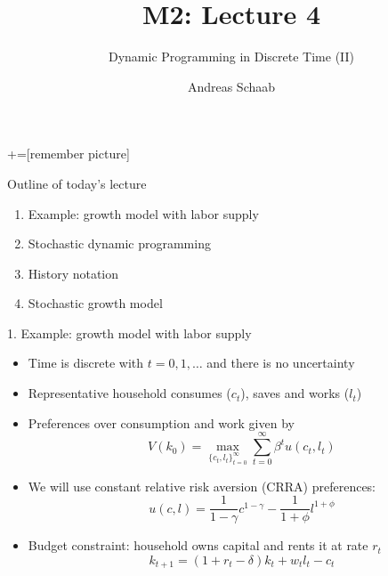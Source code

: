 \documentclass[10pt]{beamer}
\title{\large M2: Lecture 4}
\subtitle{Dynamic Programming in Discrete Time (II)}
\author{Andreas Schaab}
\date{}
\begin{document}
+=[remember picture]
\thispagestyle{empty}
\maketitle 
\newpage

\addtocounter{framenumber}{-1}




\begin{frame}{Outline of today's lecture}
\begin{enumerate}
\item Example: growth model with labor supply
\item Stochastic dynamic programming
\item History notation
\item Stochastic growth model
\end{enumerate}
\end{frame}



\begin{frame}{1. Example: growth model with labor supply}
\begin{itemize}
\item Time is discrete with $t = 0, 1, \ldots$ and there is no uncertainty

\item Representative household consumes ($c_t$), saves and works ($l_t$)

\item Preferences over consumption and work given by
\begin{equation*}
	V(k_0) = \max_{ \{ c_t, l_t \}_{t=0}^\infty } \sum_{t = 0}^\infty \beta^t u(c_t, l_t)
\end{equation*}

\item We will use constant relative risk aversion (CRRA) preferences:
\begin{equation*}
	u(c, l) = \frac{1}{1-\gamma} c^{1-\gamma} - \frac{1}{1+\phi}l^{1+\phi}
\end{equation*}

\item Budget constraint: household owns capital and rents it at rate $r_t$
\begin{equation*}
	k_{t+1} = (1 + r_t - \delta) k_t + w_t l_t - c_t
\end{equation*}
\end{itemize}
\end{frame}
\end{document}
